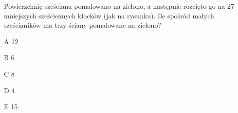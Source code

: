 \begin{tresc}
Powierzchnię sześcianu pomalowano na zielono, a następnie rozcięto go na 27 mniejszych sześciennych klocków (jak na rysunku). Ile spośród małych sześcianików ma trzy ściany pomalowane na zielono?
\end{tresc}
\begin{wariant}{A} 12 \end{wariant}
\begin{wariant}{B} 6 \end{wariant}
\begin{wariant}{C} 8 \end{wariant}
\begin{wariant}{D} 4 \end{wariant}
\begin{wariant}{E} 15 \end{wariant}
